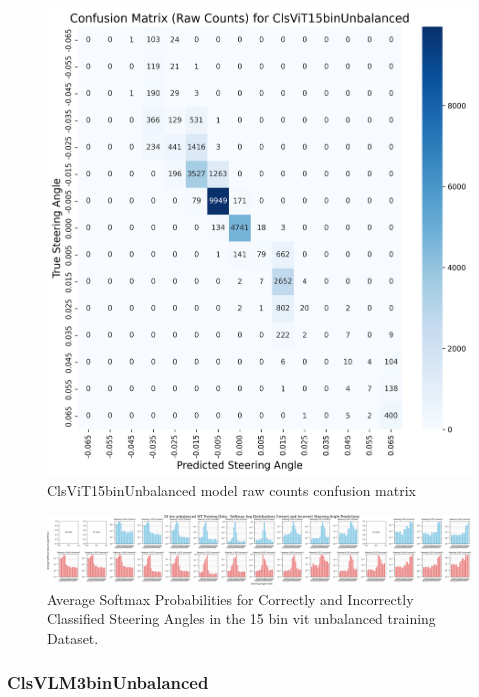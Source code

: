 \begin{figure}[H]
\centering
\includegraphics[width=1\linewidth]{Figures/Results/cm_raw_ClsViT15binUnbalanced.png}
\caption{ClsViT15binUnbalanced model raw counts confusion matrix}
\label{fig:cm_raw_ClsViT15binUnbalanced}
\end{figure}

\begin{figure}[H]
    \centering
    \includegraphics[width=1\linewidth]{Figures/Results/15_bins_vit_softmax_dist_plot_unbalanced.png}
    \caption{Average Softmax Probabilities for Correctly and Incorrectly Classified Steering Angles in the 15 bin vit unbalanced training Dataset.}
    \label{fig:15_bins_vit_softmax_dist_unbalanced}
\end{figure}


\subsubsection{ClsVLM3binUnbalanced}

